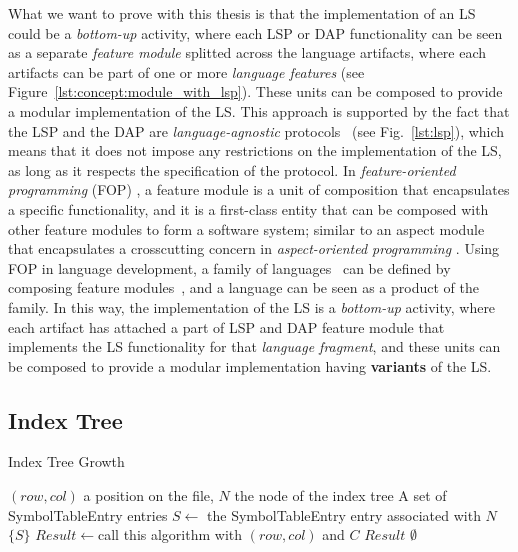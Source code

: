 What we want to prove with this thesis is that the implementation of an LS could be a \textit{bottom-up} activity, where each LSP or DAP functionality can be seen as a separate \textit{feature module} \cite{Batory04, Kastner11} splitted across the language artifacts, where each artifacts can be part of one or more \textit{language features} (see Figure~\ref{lst:concept:module_with_lsp}). These units can be composed to provide a modular implementation of the LS. This approach is supported by the fact that the LSP and the DAP are \textit{language-agnostic} protocols~\cite{Niephaus20, Rodriguez-Echeverria18} (see Fig.~\ref{lst:lsp}), which means that it does not impose any restrictions on the implementation of the LS, as long as it respects the specification of the protocol.
In \textit{feature-oriented programming} (FOP) \cite{Apel13, Czarnecki04, Prehofer01}, a feature module is a unit of composition that encapsulates a specific functionality, and it is a first-class entity that can be composed with other feature modules to form a software system; similar to an aspect module that encapsulates a crosscutting concern in \textit{aspect-oriented programming} \cite{Kiczales01, Kiczales97, Laddad03}. Using FOP in language development, a family of languages~\cite{Liebig13} can be defined by composing feature modules~\cite{Wende09}, and a language can be seen as a product of the family.
In this way, the implementation of the LS is a \textit{bottom-up} activity, where each artifact has attached a part of LSP and DAP feature module that implements the LS functionality for that \textit{language fragment}, and these units can be composed to provide a modular implementation having \textbf{variants} of the LS.

\subsection{Index Tree}\label{subsec:concept:IndexTree}

\begin{algorithm}[tbh]
    \caption{Index Tree Growth}\label{alg:index_tree}
    \begin{algorithmic}
        \Require $(row, col)$ a position on the file, $N$ the node of the index tree
        \Ensure A set of SymbolTableEntry entries
        \State $S \gets$ the SymbolTableEntry entry associated with $N$
        \State \Return $\{S\}$
        \State $Result\gets$call this algorithm with $(row, col)$ and $C$
        \Return $Result$
        \EndIf
        \EndFor
        \Else
        \State \Return $\emptyset$
        \EndIf
    \end{algorithmic}
\end{algorithm}

